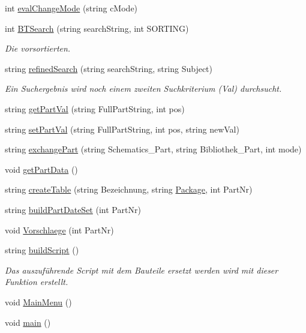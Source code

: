 \begin{DoxyCompactItemize}
\item 
int \hyperlink{_platzhalter_ersetzen_8ulp_a0e3590d014de5f3be63f639de961670b}{eval\+Change\+Mode} (string c\+Mode)
\item 
int \hyperlink{_platzhalter_ersetzen_8ulp_ae5c6c522b45bea7503caaebd0e215bce}{B\+T\+Search} (string search\+String, int S\+O\+R\+T\+I\+N\+G)
\begin{DoxyCompactList}\small\item\em Die vorsortierten. \end{DoxyCompactList}\item 
string \hyperlink{_platzhalter_ersetzen_8ulp_abf112b617933352e6ea9f00864bc16a4}{refined\+Search} (string search\+String, string Subject)
\begin{DoxyCompactList}\small\item\em Ein Suchergebnis wird noch einem zweiten Suchkriterium (Val) durchsucht. \end{DoxyCompactList}\item 
string \hyperlink{_platzhalter_ersetzen_8ulp_a034e0e67b07ac51a39b8fb684448d388}{get\+Part\+Val} (string Full\+Part\+String, int pos)
\item 
string \hyperlink{_platzhalter_ersetzen_8ulp_ab03810066546e171a6a7c77464b0fc2c}{set\+Part\+Val} (string Full\+Part\+String, int pos, string new\+Val)
\item 
string \hyperlink{_platzhalter_ersetzen_8ulp_a7c0dbd82f8a7792c2dcc1514c7cc9ea5}{exchange\+Part} (string Schematics\+\_\+\+Part, string Bibliothek\+\_\+\+Part, int mode)
\item 
void \hyperlink{_platzhalter_ersetzen_8ulp_a47d2d84792b1656dd5e93a65568957d8}{get\+Part\+Data} ()
\item 
string \hyperlink{_platzhalter_ersetzen_8ulp_aef12a8767a8ada77c881e61e855671a5}{create\+Table} (string Bezeichnung, string \hyperlink{test_8ulp_a36b57fe679881487796855a589fbfb85}{Package}, int Part\+Nr)
\item 
string \hyperlink{_platzhalter_ersetzen_8ulp_ac9f3dedd7cfb3ef571bac7df07e50eb5}{build\+Part\+Date\+Set} (int Part\+Nr)
\item 
void \hyperlink{_platzhalter_ersetzen_8ulp_a005756a3de9c56f60d7697b8ccc8a1a2}{Vorschlaege} (int Part\+Nr)
\item 
string \hyperlink{_platzhalter_ersetzen_8ulp_a9487a453345a14f60a73b77eaf2455bb}{build\+Script} ()
\begin{DoxyCompactList}\small\item\em Das auszuführende Script mit dem Bauteile ersetzt werden wird mit dieser Funktion erstellt. \end{DoxyCompactList}\item 
void \hyperlink{_platzhalter_ersetzen_8ulp_ab98dbf196398d8aeaa4ac97f87ae54a1}{Main\+Menu} ()
\item 
void \hyperlink{_platzhalter_ersetzen_8ulp_acdef7a1fd863a6d3770c1268cb06add3}{main} ()
\end{DoxyCompactItemize}
